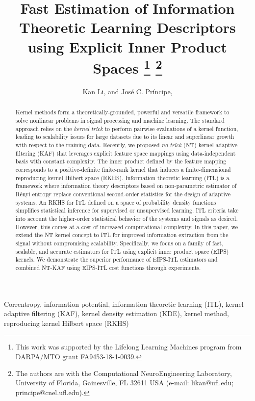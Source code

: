 \documentclass[8pt,twocolumn]{IEEEtran}
\begin{document}
\title{Fast Estimation of Information Theoretic Learning Descriptors using Explicit Inner Product Spaces
		\thanks{This work was supported by the Lifelong Learning Machines program from DARPA/MTO grant FA9453-18-1-0039.}
		\thanks{The authors are with the Computational NeuroEngineering Laboratory, University of Florida, Gainesville, FL 32611 USA  (e-mail: likan@ufl.edu; principe@cnel.ufl.edu).}}
	\author{Kan Li,  and Jos\'{e} C. Pr\'{i}ncipe, }
	\maketitle
	
\begin{abstract}
Kernel methods form a theoretically-grounded, powerful and versatile framework to solve nonlinear problems in signal processing and machine learning.	The standard approach relies on the \emph{kernel trick} to perform pairwise evaluations of a kernel function, leading to scalability issues for large datasets due to its linear and superlinear growth with respect to the training data. Recently, we proposed \emph{no-trick} (NT) kernel adaptive filtering (KAF) that leverages explicit feature space mappings using data-independent basis with constant complexity. The inner product defined by the feature mapping corresponds to a positive-definite finite-rank kernel that induces a finite-dimensional reproducing kernel Hilbert space (RKHS). Information theoretic learning (ITL) is a framework where information theory descriptors based on non-parametric estimator of R\'{e}nyi entropy replace conventional second-order statistics for the design of adaptive systems. An RKHS for ITL defined on a space of probability density functions simplifies statistical inference for supervised or unsupervised learning. ITL criteria take into account the higher-order statistical behavior of the systems and signals as desired. However, this comes at a cost of increased computational complexity. In this paper, we extend the NT kernel concept to ITL for improved information extraction from the signal without compromising scalability. Specifically, we focus on a family of fast, scalable, and accurate estimators for ITL using explicit inner product space (EIPS) kernels. We demonstrate the superior performance of EIPS-ITL estimators and combined NT-KAF using EIPS-ITL cost functions through experiments.
\end{abstract}
\begin{IEEEkeywords} 
Correntropy, information potential, information theoretic learning (ITL), kernel adaptive filtering (KAF), kernel density estimation (KDE), kernel method, reproducing kernel Hilbert space (RKHS)
\end{IEEEkeywords}
	
\end{document}
